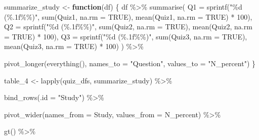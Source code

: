 \documentclass[
  man]{apa7}
\newenvironment{Shaded}{\begin{snugshade}}{\end{snugshade}}
\newcommand{\AttributeTok}[1]{\textcolor[rgb]{0.40,0.45,0.13}{#1}}
\newcommand{\ConstantTok}[1]{\textcolor[rgb]{0.56,0.35,0.01}{#1}}
\newcommand{\ControlFlowTok}[1]{\textcolor[rgb]{0.00,0.23,0.31}{\textbf{#1}}}
\newcommand{\DecValTok}[1]{\textcolor[rgb]{0.68,0.00,0.00}{#1}}
\newcommand{\FunctionTok}[1]{\textcolor[rgb]{0.28,0.35,0.67}{#1}}
\newcommand{\NormalTok}[1]{\textcolor[rgb]{0.00,0.23,0.31}{#1}}
\newcommand{\OtherTok}[1]{\textcolor[rgb]{0.00,0.23,0.31}{#1}}
\newcommand{\SpecialCharTok}[1]{\textcolor[rgb]{0.37,0.37,0.37}{#1}}
\newcommand{\StringTok}[1]{\textcolor[rgb]{0.13,0.47,0.30}{#1}}
\begin{document}
\begin{Shaded}
\begin{Highlighting}[]
\NormalTok{summarize\_study }\OtherTok{\textless{}{-}} \ControlFlowTok{function}\NormalTok{(df) \{}
\NormalTok{  df }\SpecialCharTok{\%\textgreater{}\%}
    \FunctionTok{summarise}\NormalTok{(}
      \AttributeTok{Q1 =} \FunctionTok{sprintf}\NormalTok{(}\StringTok{"\%d (\%.1f\%\%)"}\NormalTok{, }\FunctionTok{sum}\NormalTok{(Quiz1, }\AttributeTok{na.rm =} \ConstantTok{TRUE}\NormalTok{),}
                      \FunctionTok{mean}\NormalTok{(Quiz1, }\AttributeTok{na.rm =} \ConstantTok{TRUE}\NormalTok{) }\SpecialCharTok{*} \DecValTok{100}\NormalTok{),}
      \AttributeTok{Q2 =} \FunctionTok{sprintf}\NormalTok{(}\StringTok{"\%d (\%.1f\%\%)"}\NormalTok{, }\FunctionTok{sum}\NormalTok{(Quiz2, }\AttributeTok{na.rm =} \ConstantTok{TRUE}\NormalTok{),}
                      \FunctionTok{mean}\NormalTok{(Quiz2, }\AttributeTok{na.rm =} \ConstantTok{TRUE}\NormalTok{) }\SpecialCharTok{*} \DecValTok{100}\NormalTok{),}
      \AttributeTok{Q3 =} \FunctionTok{sprintf}\NormalTok{(}\StringTok{"\%d (\%.1f\%\%)"}\NormalTok{, }\FunctionTok{sum}\NormalTok{(Quiz3, }\AttributeTok{na.rm =} \ConstantTok{TRUE}\NormalTok{),}
                      \FunctionTok{mean}\NormalTok{(Quiz3, }\AttributeTok{na.rm =} \ConstantTok{TRUE}\NormalTok{) }\SpecialCharTok{*} \DecValTok{100}\NormalTok{)}
\NormalTok{    ) }\SpecialCharTok{\%\textgreater{}\%}
    
    \FunctionTok{pivot\_longer}\NormalTok{(}\FunctionTok{everything}\NormalTok{(), }\AttributeTok{names\_to =} \StringTok{"Question"}\NormalTok{, }\AttributeTok{values\_to =} \StringTok{"N\_percent"}\NormalTok{)}
\NormalTok{\}}

\NormalTok{table\_4 }\OtherTok{\textless{}{-}} \FunctionTok{lapply}\NormalTok{(quiz\_dfs, summarize\_study) }\SpecialCharTok{\%\textgreater{}\%}
  
  \FunctionTok{bind\_rows}\NormalTok{(}\AttributeTok{.id =} \StringTok{"Study"}\NormalTok{) }\SpecialCharTok{\%\textgreater{}\%}
  
  \FunctionTok{pivot\_wider}\NormalTok{(}\AttributeTok{names\_from =}\NormalTok{ Study, }\AttributeTok{values\_from =}\NormalTok{ N\_percent) }\SpecialCharTok{\%\textgreater{}\%}
  
  \FunctionTok{gt}\NormalTok{() }\SpecialCharTok{\%\textgreater{}\%}
  

\end{Highlighting}
\end{Shaded}
\end{document}
